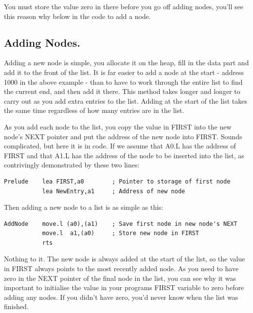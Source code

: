 You must store the value zero in there before you go off adding
    nodes, you'll see this reason why below in the code to add a node.

\subsection{Adding Nodes.}
\label{ch10-adding-nodes}%

Adding a new node is simple, you allocate it on the heap, fill in
      the data part and add it to the front of the list. It is far easier to
      add a node at the start -{} address 1000 in the above example -{} than to
      have to work through the entire list to find the current end, and then
      add it there. This method takes longer and longer to carry out as you
      add extra entries to the list. Adding at the start of the list takes the
      same time regardless of how many entries are in the list.

As you add each node to the list, you copy the value in FIRST into
      the new node's NEXT pointer and put the address of the new node into
      FIRST. Sounds complicated, but here it is in code. If we assume that
      A0.L has the address of FIRST and that A1.L has the address of the node
      to be inserted into the list, as contrivingly demonstrated by these two
      lines:

\begin{lstlisting}[firstnumber=1,caption={Adding a Node - Prelude},label={lst:AddingANodePrelude}]
Prelude    lea FIRST,a0        ; Pointer to storage of first node 
           lea NewEntry,a1     ; Address of new node
\end{lstlisting}

Then adding a new node to a list is as simple as this:

\begin{lstlisting}[firstnumber=last,caption={Adding a Node},label={lst:AddingANode}]
AddNode    move.l (a0),(a1)    ; Save first node in new node's NEXT
           move.l  a1,(a0)     ; Store new node in FIRST
           rts
\end{lstlisting}

Nothing to it. The new node is always added at the start of the
      list, so the value in FIRST always points to the most recently added
      node. As you need to have zero in the NEXT pointer of the final node in
      the list, you can see why it was important to initialise the value in
      your programs FIRST variable to zero before adding any nodes. If you
      didn't have zero, you'd never know when the list was finished.

